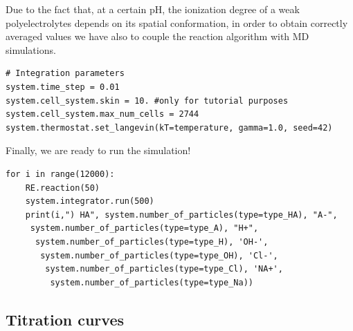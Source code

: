\documentclass[
a4paper,                        %
11pt,                           %
twoside,                        %
footsepline,                    %
headsepline,                    %
headexclude,                    %
footexclude,                    %
pagesize,                       %
]{scrartcl}
\begin{document}
Due to the fact that, at a certain pH, the ionization degree of a weak polyelectrolytes depends on its spatial conformation, in order to obtain  correctly averaged values we have also to couple the reaction algorithm with MD simulations. 
\begin{verbatim}
# Integration parameters
system.time_step = 0.01
system.cell_system.skin = 10. #only for tutorial purposes 
system.cell_system.max_num_cells = 2744
system.thermostat.set_langevin(kT=temperature, gamma=1.0, seed=42)
\end{verbatim}
Finally, we are ready to run the simulation!
\begin{verbatim}
for i in range(12000):
    RE.reaction(50)
    system.integrator.run(500) 
    print(i,") HA", system.number_of_particles(type=type_HA), "A-",
     system.number_of_particles(type=type_A), "H+",
      system.number_of_particles(type=type_H), 'OH-',
       system.number_of_particles(type=type_OH), 'Cl-',
        system.number_of_particles(type=type_Cl), 'NA+',
         system.number_of_particles(type=type_Na))
\end{verbatim}



\subsection{Titration curves}
\end{document}
